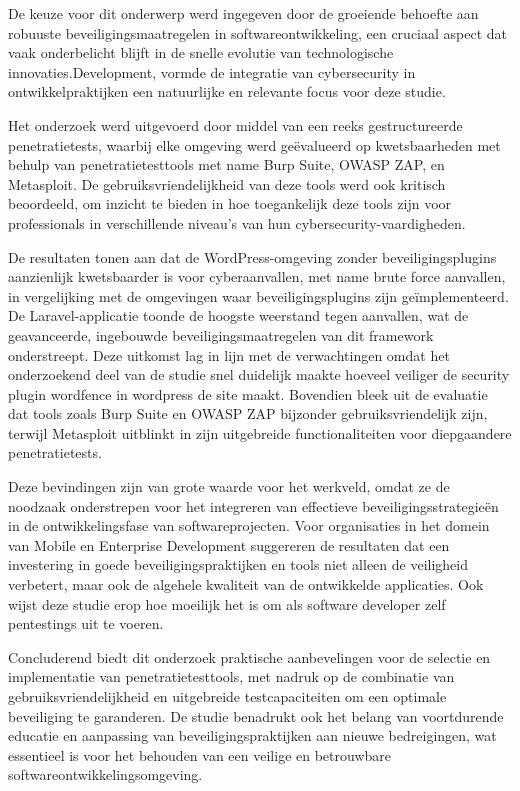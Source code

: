 De keuze voor dit onderwerp werd ingegeven door de groeiende behoefte aan robuuste beveiligingsmaatregelen in softwareontwikkeling, een cruciaal 
aspect dat vaak onderbelicht blijft in de snelle evolutie van technologische innovaties.Development, vormde de integratie van cybersecurity in 
ontwikkelpraktijken een natuurlijke en relevante focus voor deze studie.

Het onderzoek werd uitgevoerd door middel van een reeks gestructureerde penetratietests, waarbij elke omgeving werd geëvalueerd op 
kwetsbaarheden met behulp van penetratietesttools met name Burp Suite, OWASP ZAP, en Metasploit. De gebruiksvriendelijkheid 
van deze tools werd ook kritisch beoordeeld, om inzicht te bieden in hoe toegankelijk deze tools zijn voor professionals in verschillende 
niveau's van hun cybersecurity-vaardigheden.

De resultaten tonen aan dat de WordPress-omgeving zonder beveiligingsplugins aanzienlijk kwetsbaarder is voor cyberaanvallen, met name 
brute force aanvallen, in vergelijking met de omgevingen waar beveiligingsplugins zijn geïmplementeerd. De Laravel-applicatie toonde 
de hoogste weerstand tegen aanvallen, wat de geavanceerde, ingebouwde beveiligingsmaatregelen van dit framework onderstreept.
Deze uitkomst lag in lijn met de verwachtingen omdat het onderzoekend deel van de studie snel duidelijk maakte hoeveel veiliger 
de security plugin wordfence in wordpress de site maakt.
Bovendien bleek uit de evaluatie dat tools zoals Burp Suite en OWASP ZAP bijzonder gebruiksvriendelijk zijn, terwijl Metasploit 
uitblinkt in zijn uitgebreide functionaliteiten voor diepgaandere penetratietests.

Deze bevindingen zijn van grote waarde voor het werkveld, omdat ze de noodzaak onderstrepen voor het integreren van effectieve 
beveiligingsstrategieën in de ontwikkelingsfase van softwareprojecten. Voor organisaties in het domein van Mobile en Enterprise 
Development suggereren de resultaten dat een investering in goede beveiligingspraktijken en tools niet alleen de veiligheid 
verbetert, maar ook de algehele kwaliteit van de ontwikkelde applicaties. Ook wijst deze studie erop hoe moeilijk het 
is om als software developer zelf pentestings uit te voeren.

Concluderend biedt dit onderzoek praktische aanbevelingen voor de selectie en implementatie van penetratietesttools, met 
nadruk op de combinatie van gebruiksvriendelijkheid en uitgebreide testcapaciteiten om een optimale beveiliging te 
garanderen. De studie benadrukt ook het belang van voortdurende educatie en aanpassing van beveiligingspraktijken aan nieuwe 
bedreigingen, wat essentieel is voor het behouden van een veilige en betrouwbare softwareontwikkelingsomgeving.
